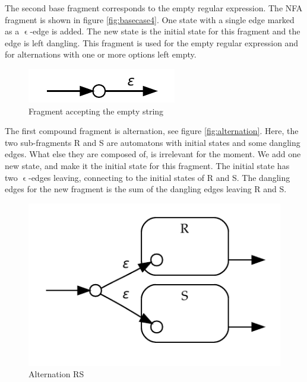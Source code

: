 The second base fragment corresponds to the empty regular
expression. The NFA fragment is shown in figure
\vref{fig:basecase4}. One state with a single edge marked as a
$\upvarepsilon$-edge is added. The new state is the initial state for
this fragment and the edge is left dangling. This fragment is used for
the empty regular expression and for alternations with one or more
options left empty.





\begin{figure}
  \centering
  \includegraphics{parsing/basecase4}
  \caption{Fragment accepting the empty string}
  \label{fig:basecase4}
\end{figure}



The first compound fragment is alternation, see figure
\vref{fig:alternation}. Here, the two sub-fragments R and S are automatons
with initial states and some dangling edges. What else they are
composed of, is irrelevant for the moment. We add one new state, 
and make it the initial state for this fragment. The initial state has two
$\upvarepsilon$-edges leaving, connecting to the initial states of R
and S. The dangling edges for the new fragment is the sum of the
dangling edges leaving R and S.

\begin{figure}
  \centering
  \includegraphics{parsing/alternation}
  \caption{Alternation R\textbar S}
  \label{fig:alternation}
\end{figure}

